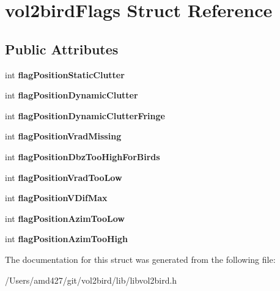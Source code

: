 \hypertarget{structvol2birdFlags}{}\section{vol2bird\+Flags Struct Reference}
\label{structvol2birdFlags}
\subsection*{Public Attributes}
\begin{DoxyCompactItemize}
\item 
\mbox{\label{structvol2birdFlags_ac34a281bd943c2f8cedbb3a8eb34047c}} 
int {\bfseries flag\+Position\+Static\+Clutter}
\item 
\mbox{\label{structvol2birdFlags_acc985b6ebf504a39d9f33e67ad682ad4}} 
int {\bfseries flag\+Position\+Dynamic\+Clutter}
\item 
\mbox{\label{structvol2birdFlags_a4e9a9fbce4c59315ce7a094d587f2aaf}} 
int {\bfseries flag\+Position\+Dynamic\+Clutter\+Fringe}
\item 
\mbox{\label{structvol2birdFlags_ab2aba092d16263e01e849d4b0de3c9b4}} 
int {\bfseries flag\+Position\+Vrad\+Missing}
\item 
\mbox{\label{structvol2birdFlags_ac8dea02fed56c639860d2cdac15dcd4c}} 
int {\bfseries flag\+Position\+Dbz\+Too\+High\+For\+Birds}
\item 
\mbox{\label{structvol2birdFlags_af79a6ef71563727c0ea9ec67e2e470b9}} 
int {\bfseries flag\+Position\+Vrad\+Too\+Low}
\item 
\mbox{\label{structvol2birdFlags_a526fb45b39c273fc2498dbb8c50e4a91}} 
int {\bfseries flag\+Position\+V\+Dif\+Max}
\item 
\mbox{\label{structvol2birdFlags_a8369bd67547e171972c6759e125e1d6b}} 
int {\bfseries flag\+Position\+Azim\+Too\+Low}
\item 
\mbox{\label{structvol2birdFlags_a7590a6fd06441d6f2261c72039a1380f}} 
int {\bfseries flag\+Position\+Azim\+Too\+High}
\end{DoxyCompactItemize}


The documentation for this struct was generated from the following file\+:\begin{DoxyCompactItemize}
\item 
/\+Users/amd427/git/vol2bird/lib/libvol2bird.\+h\end{DoxyCompactItemize}
